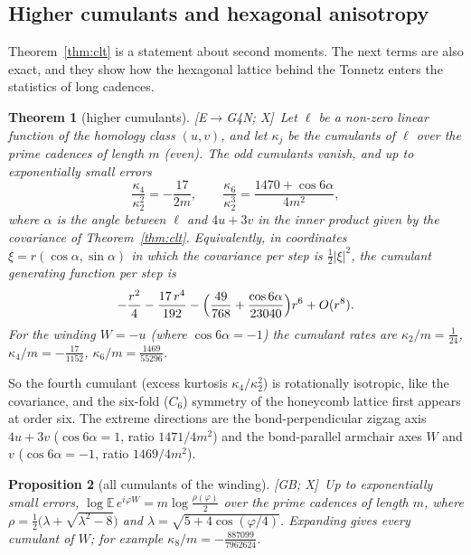 \documentclass[11pt]{amsart}
\numberwithin{equation}{section}
\theoremstyle{plain}
\newtheorem{theorem}{Theorem}[section]
\newtheorem{proposition}[theorem]{Proposition}
\theoremstyle{definition}\newtheorem{definition}[theorem]{Definition}
\theoremstyle{remark}\newtheorem{remark}[theorem]{Remark}
\newcommand{\ctag}[1]{\textup{\textsf{\scriptsize[#1]}}}
\begin{document}
\subsection{Higher cumulants and hexagonal anisotropy}\label{sec:cumulants}
Theorem~\ref{thm:clt} is a statement about second moments. The next terms are also exact, and they show how the hexagonal lattice behind the Tonnetz enters the statistics of long cadences.
\begin{theorem}[higher cumulants]\label{thm:cumulants}
\ctag{E$\to$G4N; X}\ Let $\ell$ be a non-zero linear function of the homology class $(u,v)$, and let $\kappa_j$ be the cumulants of $\ell$ over the prime cadences of length $m$ (even). The odd cumulants vanish, and up to exponentially small errors
\[\frac{\kappa_4}{\kappa_2^2}=-\frac{17}{2m},\qquad\frac{\kappa_6}{\kappa_2^3}=\frac{1470+\cos6\alpha}{4m^2},\]
where $\alpha$ is the angle between $\ell$ and $4u+3v$ in the inner product given by the covariance of Theorem~\ref{thm:clt}. Equivalently, in coordinates $\xi=r(\cos\alpha,\sin\alpha)$ in which the covariance per step is $\frac12|\xi|^2$, the cumulant generating function per step is
\[-\frac{r^2}{4}-\frac{17\,r^4}{192}-\Bigl(\frac{49}{768}+\frac{\cos6\alpha}{23040}\Bigr)r^6+O(r^8).\]
For the winding $W=-u$ (where $\cos6\alpha=-1$) the cumulant rates are $\kappa_2/m=\frac1{24}$, $\kappa_4/m=-\frac{17}{1152}$, $\kappa_6/m=\frac{1469}{55296}$.
\end{theorem}
So the fourth cumulant (excess kurtosis $\kappa_4/\kappa_2^2$) is rotationally isotropic, like the covariance, and the six-fold ($C_6$) symmetry of the honeycomb lattice first appears at order six. The extreme directions are the bond-perpendicular zigzag axis $4u+3v$ ($\cos6\alpha=1$, ratio $1471/4m^2$) and the bond-parallel armchair axes $W$ and $v$ ($\cos6\alpha=-1$, ratio $1469/4m^2$).
\begin{proposition}[all cumulants of the winding]\label{prop:Wcgf}
\ctag{GB; X}\ Up to exponentially small errors, $\log\mathbb E\,e^{i\varphi W}=m\log\frac{\rho(\varphi)}2$ over the prime cadences of length $m$, where $\rho=\frac12\bigl(\lambda+\sqrt{\lambda^2-8}\bigr)$ and $\lambda=\sqrt{5+4\cos(\varphi/4)}$. Expanding gives every cumulant of $W$; for example $\kappa_8/m=-\frac{887099}{7962624}$.
\end{proposition}
\end{document}

